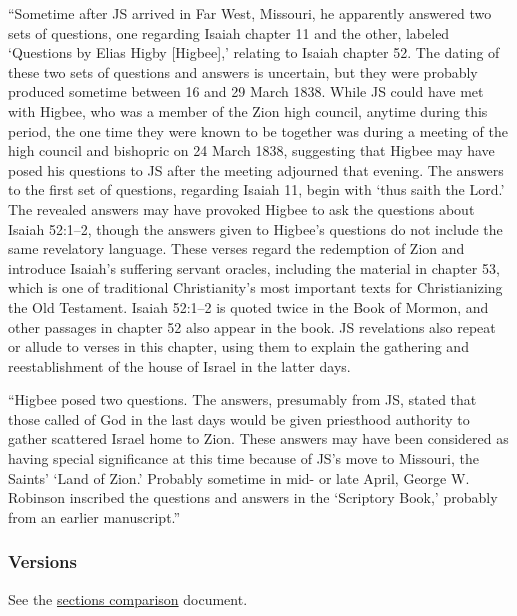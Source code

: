 				``Sometime after JS arrived in Far West, Missouri, he apparently answered two sets of questions, one regarding Isaiah chapter 11 and the other, labeled `Questions by Elias Higby [Higbee],' relating to Isaiah chapter 52. The dating of these two sets of questions and answers is uncertain, but they were probably produced sometime between 16 and 29 March 1838. While JS could have met with Higbee, who was a member of the Zion high council, anytime during this period, the one time they were known to be together was during a meeting of the high council and bishopric on 24 March 1838, suggesting that Higbee may have posed his questions to JS after the meeting adjourned that evening. The answers to the first set of questions, regarding Isaiah 11, begin with `thus saith the Lord.' The revealed answers may have provoked Higbee to ask the questions about Isaiah 52:1--2, though the answers given to Higbee's questions do not include the same revelatory language. These verses regard the redemption of Zion and introduce Isaiah's suffering servant oracles, including the material in chapter 53, which is one of traditional Christianity's most important texts for Christianizing the Old Testament. Isaiah 52:1--2 is quoted twice in the Book of Mormon, and other passages in chapter 52 also appear in the book. JS revelations also repeat or allude to verses in this chapter, using them to explain the gathering and reestablishment of the house of Israel in the latter days.
				
				``Higbee posed two questions. The answers, presumably from JS, stated that those called of God in the last days would be given priesthood authority to gather scattered Israel home to Zion. These answers may have been considered as having special significance at this time because of JS's move to Missouri, the Saints' `Land of Zion.' Probably sometime in mid- or late April, George W. Robinson inscribed the questions and answers in the `Scriptory Book,' probably from an earlier manuscript.''
					
	\subsubsection{Versions}
		\label{DC113-V}
		
		See the \href{https://drive.google.com/file/d/1goAvNz8jS4R8slYfMG_db55Ty2z_vmgK/view?usp=sharing}{sections comparison} document.
	
